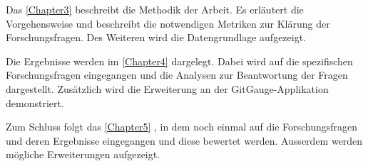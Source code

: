 Das \autoref{Chapter3} \textit{} beschreibt die Methodik der Arbeit. Es erläutert die Vorgehensweise und beschreibt die notwendigen Metriken zur Klärung der Forschungsfragen. Des Weiteren wird die Datengrundlage aufgezeigt.


Die Ergebnisse werden im \autoref{Chapter4} \textit{} dargelegt. Dabei wird auf die spezifischen Forschungsfragen eingegangen und die Analysen zur Beantwortung der Fragen dargestellt. Zusätzlich wird die Erweiterung an der GitGauge-Applikation demonstriert.

Zum Schluss folgt das \autoref{Chapter5} \textit{}, in dem noch einmal auf die Forschungsfragen und deren Ergebnisse eingegangen und diese bewertet werden. Ausserdem werden mögliche Erweiterungen aufgezeigt.






